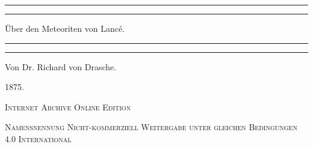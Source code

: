 \documentclass[a4paper, 11pt, oneside]{article}
\begin{document}
\frakfamily
\begin{titlepage} %
	\centering %

	
	\rule{\textwidth}{1.6pt}\vspace*{-\baselineskip}\vspace*{2pt} %
	\rule{\textwidth}{0.4pt} %
	
	\vspace{1.5\baselineskip} %
	
	{\Huge Über den Meteoriten von Lancé.}
	
	\vspace{1.5\baselineskip} %

	\rule{\textwidth}{0.4pt}\vspace*{-\baselineskip}\vspace{3.2pt} %
	\rule{\textwidth}{1.6pt} %
	
	\vspace{1\baselineskip} %
	
	
	{\large Von Dr. Richard von Drasche.} %
	
	\vspace*{1\baselineskip} %
	
    \vspace*{\fill}

	\vspace{1\baselineskip}

	{\small\scshape 1875.}
	
	\vspace{0.5\baselineskip} %

    \scshape Internet Archive Online Edition  %
	
	{\scshape\small Namensnennung Nicht-kommerziell Weitergabe unter gleichen Bedingungen 4.0 International} %
\end{titlepage}
\setlength{\parskip}{1mm plus1mm minus1mm}
\clearpage
\LARGE
\pagestyle{fancy}
\fancyhf{}
\cfoot{\frakfamily{\thepage}}
\end{document}
